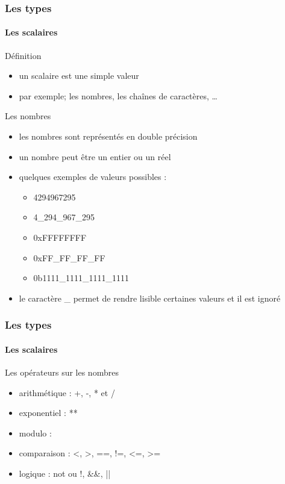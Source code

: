 \begin{frame}[fragile]
  \frametitle{Les types}
  \framesubtitle{Les scalaires}

  \begin{block}{Définition}
    \begin{itemize}
    \item un scalaire est une simple valeur
    \item par exemple; les nombres, les chaînes de caractères, \ldots
    \end{itemize}
  \end{block}

  \begin{exampleblock}{Les nombres}
    \begin{itemize}
    \item les nombres sont représentés en double précision
    \item un nombre peut être un entier ou un réel
    \item quelques exemples de valeurs possibles :
      \begin{itemize}
      \item 4294967295
      \item 4\_294\_967\_295
      \item 0xFFFFFFFF
      \item 0xFF\_FF\_FF\_FF
      \item 0b1111\_1111\_1111\_1111
      \end{itemize}
    \item le caractère \_ permet de rendre lisible certaines valeurs et il est
      ignoré
    \end{itemize}
  \end{exampleblock}

\end{frame}

\begin{frame}[fragile]
  \frametitle{Les types}
  \framesubtitle{Les scalaires}

  \begin{block}{Les opérateurs sur les nombres}
    \begin{itemize}
    \item arithmétique : +, -, * et /
    \item exponentiel : **
    \item modulo : %
    \item comparaison : <, >, ==, !=, <=, >=
    \item logique : not ou !, \&\&, ||
    \end{itemize}
  \end{block}

\end{frame}

